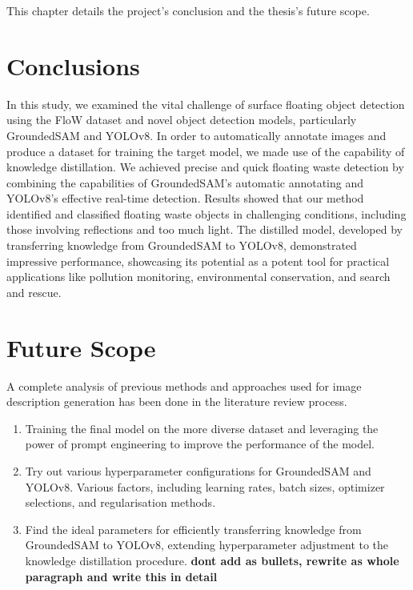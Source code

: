 \clearpage
\noindent This chapter details the project's conclusion and the thesis's future scope.

\section{Conclusions}
\noindent In this study, we examined the vital challenge of surface floating object detection using the FloW dataset and novel object detection models, particularly GroundedSAM and YOLOv8. In order to automatically annotate images and produce a dataset for training the target model, we made use of the capability of knowledge distillation. We achieved precise and quick floating waste detection by combining the capabilities of GroundedSAM's automatic annotating and YOLOv8's effective real-time detection.
Results showed that our method identified and classified floating waste objects in challenging conditions, including those involving reflections and too much light. The distilled model, developed by transferring knowledge from GroundedSAM to YOLOv8, demonstrated impressive performance, showcasing its potential as a potent tool for practical applications like pollution monitoring, environmental conservation, and search and rescue.

\section{Future Scope}
\noindent A complete analysis of previous methods and approaches used for image description generation has been done in the literature review process.
\begin{enumerate}
    \item Training the final model on the more diverse dataset and leveraging the power of prompt engineering to improve the performance of the model.
    \item Try out various hyperparameter configurations for GroundedSAM and YOLOv8. Various factors, including learning rates, batch sizes, optimizer selections, and regularisation methods.
    \item Find the ideal parameters for efficiently transferring knowledge from GroundedSAM to YOLOv8, extending hyperparameter adjustment to the knowledge distillation procedure.
    \textbf{dont add as bullets, rewrite as whole paragraph and write this in detail}
\end{enumerate}